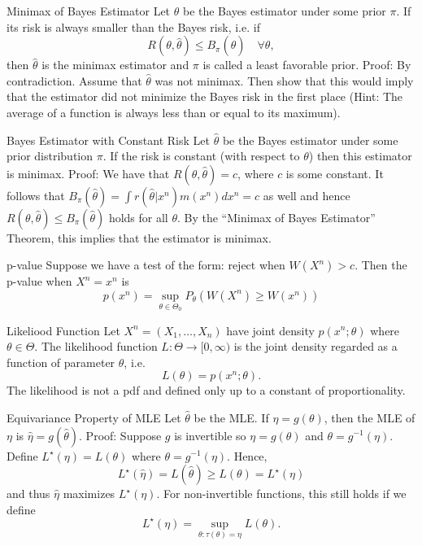\documentclass[avery5371,grid]{flashcards}
\begin{document}
\begin{flashcard}[Theorem]{Minimax of Bayes Estimator}
\scriptsize
 Let $\hat \theta$ be the Bayes estimator under some prior $\pi$. If its risk is always smaller 
 than the Bayes risk, i.e. if 
 \[
 R(\theta, \hat \theta) \le B_\pi (\hat \theta) \quad \forall \theta,
 \]
 then $\hat \theta$ is the minimax estimator and $\pi$ is called a least favorable prior.
Proof: By contradiction. Assume that $\hat \theta$ was not minimax. Then show that this would imply that the estimator
did not minimize the Bayes risk in the first place (Hint: The average of a function is always less than or equal to its maximum).
 \end{flashcard}

\begin{flashcard}[Theorem]{Bayes Estimator with Constant Risk}
\scriptsize
Let $\hat \theta$ be the Bayes estimator under some prior distribution $\pi$. If the risk is constant (with respect to
$\theta$) then this estimator is minimax. 
Proof: We have that $R\left(\theta,\hat \theta \right) = c$, where $c$ is some constant.
It follows that $B_\pi (\hat \theta) = \int  r(\hat \theta | x^n) m(x^n) dx^n = c$ as well and hence
$R\left(\theta,\hat \theta \right) \le B_\pi (\hat \theta)$ holds for all $\theta$. By the 
``Minimax of Bayes Estimator'' Theorem, this implies that the estimator is minimax. 
\end{flashcard}

\begin{flashcard}[Theorem]{p-value}
Suppose we have a test of the form: reject when $W(X^n)>c$. Then the p-value when $X^n = x^n$ is 
\[
p(x^n)=\sup_{\theta \in \Theta_0} P_\theta \left(W(X^n) \ge W(x^n) \right)
\]
\end{flashcard}

\begin{flashcard}[Definition]{Likeliood Function}
 Let $X^n = \left(X_1, \ldots, X_n\right)$ have joint density $p(x^n;\theta)$ where $\theta \in \Theta$.
 The likelihood function $L: \Theta \to [0,\infty)$ is the joint density regarded as a function of parameter $\theta$, i.e.
 \[
 L(\theta) = p(x^n;\theta).
 \]
The likelihood is not a pdf and defined only up to a constant of proportionality.
\end{flashcard}

\begin{flashcard}[Theorem]{Equivariance Property of MLE}
\scriptsize
Let $\hat \theta$ be the MLE. If $\eta = g(\theta)$, then the MLE of $\eta$ is 
$\hat \eta = g(\hat \theta)$.
Proof: Suppose $g$ is invertible so $\eta = g(\theta)$ and $\theta = g^{-1}(\eta)$. Define
$L^\star(\eta) = L(\theta)$ where $\theta = g^{-1}(\eta)$. Hence,
\[
L^\star(\hat \eta)  = L(\hat \theta) \ge L(\theta) = L^{\star}(\eta)
\]
and thus $\hat \eta$ maximizes $L^\star(\eta)$. For non-invertible functions, this still holds if
we define
\[
L^\star(\eta) = \sup_{\theta: \tau(\theta) = \eta} L(\theta).
\]
\end{flashcard}
\end{document}
